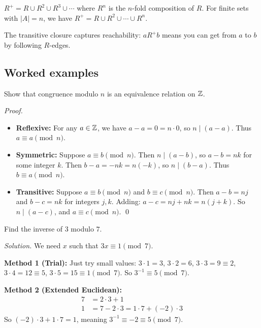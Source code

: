 \begin{theorem}
$R^+ = R \cup R^2 \cup R^3 \cup \cdots$ where $R^n$ is the $n$-fold composition of $R$. For finite sets with $|A| = n$, we have $R^+ = R \cup R^2 \cup \cdots \cup R^n$.
\end{theorem}

The transitive closure captures reachability: $a R^+ b$ means you can get from $a$ to $b$ by following $R$-edges.

\subsection*{Worked examples}

\begin{example}
Show that congruence modulo $n$ is an equivalence relation on $\mathbb{Z}$.

\emph{Proof.}
\begin{itemize}
  \item \textbf{Reflexive:} For any $a \in \mathbb{Z}$, we have $a - a = 0 = n \cdot 0$, so $n \mid (a - a)$. Thus $a \equiv a \pmod{n}$.

  \item \textbf{Symmetric:} Suppose $a \equiv b \pmod{n}$. Then $n \mid (a - b)$, so $a - b = nk$ for some integer $k$. Then $b - a = -nk = n(-k)$, so $n \mid (b - a)$. Thus $b \equiv a \pmod{n}$.

  \item \textbf{Transitive:} Suppose $a \equiv b \pmod{n}$ and $b \equiv c \pmod{n}$. Then $a - b = nj$ and $b - c = nk$ for integers $j, k$. Adding: $a - c = nj + nk = n(j + k)$. So $n \mid (a - c)$, and $a \equiv c \pmod{n}$. \qed
\end{itemize}
\end{example}

\begin{example}
Find the inverse of $3$ modulo $7$.

\emph{Solution.} We need $x$ such that $3x \equiv 1 \pmod{7}$.

\textbf{Method 1 (Trial):} Just try small values: $3 \cdot 1 = 3$, $3 \cdot 2 = 6$, $3 \cdot 3 = 9 \equiv 2$, $3 \cdot 4 = 12 \equiv 5$, $3 \cdot 5 = 15 \equiv 1 \pmod{7}$. So $3^{-1} \equiv 5 \pmod{7}$.

\textbf{Method 2 (Extended Euclidean):}
\begin{align*}
7 &= 2 \cdot 3 + 1 \\
1 &= 7 - 2 \cdot 3 = 1 \cdot 7 + (-2) \cdot 3
\end{align*}
So $(-2) \cdot 3 + 1 \cdot 7 = 1$, meaning $3^{-1} \equiv -2 \equiv 5 \pmod{7}$.
\end{example}

